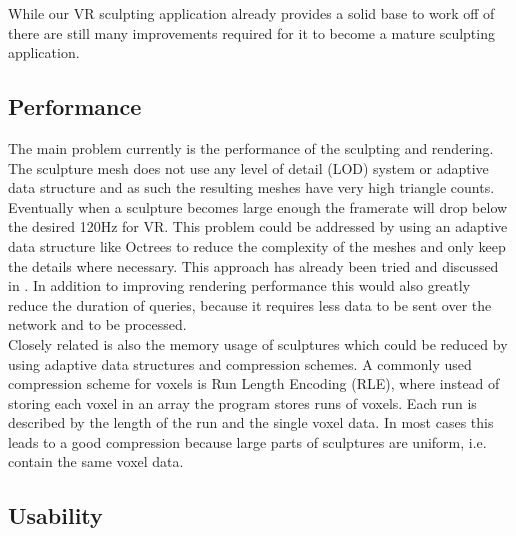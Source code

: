 While our VR sculpting application already provides a solid base to work off of there are still many improvements required for it to become a mature sculpting application.

\subsection{Performance}
The main problem currently is the performance of the sculpting and rendering. The sculpture mesh does not use any level of detail (LOD) system or adaptive data structure and as such the resulting meshes have very high triangle counts.
Eventually when a sculpture becomes large enough the framerate will drop below the desired 120Hz for VR. This problem could be addressed by using an adaptive data structure like Octrees to reduce the complexity of the meshes and only keep the details where necessary. This approach has already been tried and discussed in \cite{dual_contouring}. In addition to improving rendering performance this would also greatly reduce the duration of queries, because it requires less data to be sent over the network and to be processed.\\
Closely related is also the memory usage of sculptures which could be reduced by using adaptive data structures and compression schemes. A commonly used compression scheme for voxels is Run Length Encoding (RLE), where instead of storing
each voxel in an array the program stores runs of voxels. Each run is described by the length of the run and the single voxel data. In most cases this leads to a good compression because large parts of sculptures are uniform, i.e. contain the same voxel data.

\subsection{Usability}

